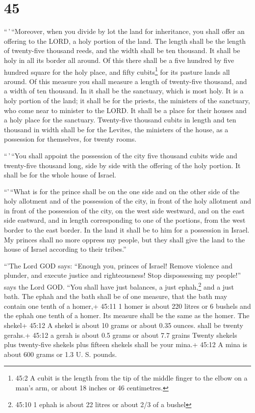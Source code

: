\hypertarget{section-43}{%
\section{45}\label{section-43}}

 ``\,'\,``Moreover, when you divide by lot the land for
inheritance, you shall offer an offering to the LORD, a holy portion of
the land. The length shall be the length of twenty-five thousand reeds,
and the width shall be ten thousand. It shall be holy in all its border
all around.  Of this there shall be a five hundred by five
hundred square for the holy place, and fifty cubits\footnote{45:2 A
  cubit is the length from the tip of the middle finger to the elbow on
  a man's arm, or about 18 inches or 46 centimetres.} for its pasture
lands all around.  Of this measure you shall measure a
length of twenty-five thousand, and a width of ten thousand. In it shall
be the sanctuary, which is most holy.  It is a holy portion
of the land; it shall be for the priests, the ministers of the
sanctuary, who come near to minister to the LORD. It shall be a place
for their houses and a holy place for the sanctuary. 
Twenty-five thousand cubits in length and ten thousand in width shall be
for the Levites, the ministers of the house, as a possession for
themselves, for twenty rooms.

 ``\,'\,``You shall appoint the possession of the city five
thousand cubits wide and twenty-five thousand long, side by side with
the offering of the holy portion. It shall be for the whole house of
Israel.

 ``'\,``What is for the prince shall be on the one side and
on the other side of the holy allotment and of the possession of the
city, in front of the holy allotment and in front of the possession of
the city, on the west side westward, and on the east side eastward, and
in length corresponding to one of the portions, from the west border to
the east border.  In the land it shall be to him for a
possession in Israel. My princes shall no more oppress my people, but
they shall give the land to the house of Israel according to their
tribes.''

 ``'The Lord GOD says: ``Enough you, princes of Israel!
Remove violence and plunder, and execute justice and righteousness! Stop
dispossessing my people!'' says the Lord GOD.  ``You shall
have just balances, a just ephah,\footnote{45:10 1 ephah is about 22
  litres or about 2/3 of a bushel} and a just bath.  The
ephah and the bath shall be of one measure, that the bath may contain
one tenth of a homer,+ 45:11 1 homer is about 220 litres or 6 bushels
and the ephah one tenth of a homer. Its measure shall be the same as the
homer.  The shekel+ 45:12 A shekel is about 10 grams or
about 0.35 ounces. shall be twenty gerahs.+ 45:12 a gerah is about 0.5
grams or about 7.7 grains Twenty shekels plus twenty-five shekels plus
fifteen shekels shall be your mina.+ 45:12 A mina is about 600 grams or
1.3 U. S. pounds.

